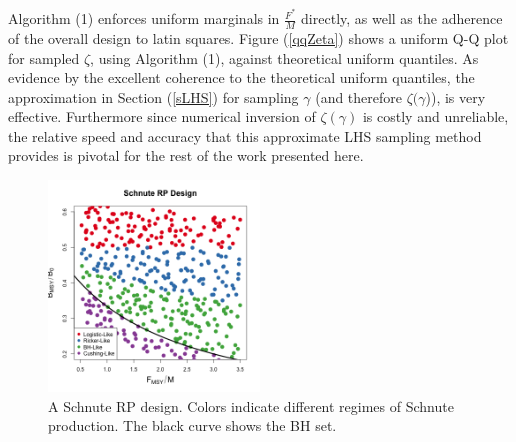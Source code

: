 %
Algorithm (1) enforces uniform marginals in $\frac{F^*}{M}$ directly, as well
as the adherence of the overall design to latin squares.  
Figure (\ref{qqZeta}) shows a uniform Q-Q plot for sampled $\zeta$, using 
Algorithm (1), against theoretical uniform quantiles. As evidence by the 
excellent coherence to the theoretical uniform quantiles, the approximation
in Section (\ref{sLHS}) for sampling $\gamma$ (and therefore $\zeta(\gamma$)), 
is very effective. 
Furthermore since numerical inversion of $\zeta(\gamma)$ is costly and 
unreliable, the relative speed and accuracy that this approximate LHS sampling 
method provides is pivotal for the rest of the work presented here. %

%


%
\begin{figure}
\vspace{-0.5cm}
\includegraphics[width=0.5\textwidth]{../gpBias/designLineColorHHardFlatT30N150WWideN112.png}
\vspace{-1cm}
\caption{
A Schnute RP design. %
Colors indicate different regimes of Schnute production. %
The black curve shows the BH set.
}
\label{colorDes}
\end{figure}

